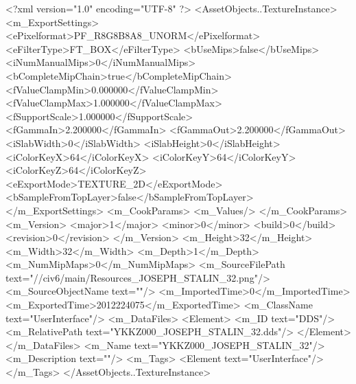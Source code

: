 <?xml version="1.0" encoding="UTF-8" ?>
<AssetObjects..TextureInstance>
	<m_ExportSettings>
		<ePixelformat>PF_R8G8B8A8_UNORM</ePixelformat>
		<eFilterType>FT_BOX</eFilterType>
		<bUseMips>false</bUseMips>
		<iNumManualMips>0</iNumManualMips>
		<bCompleteMipChain>true</bCompleteMipChain>
		<fValueClampMin>0.000000</fValueClampMin>
		<fValueClampMax>1.000000</fValueClampMax>
		<fSupportScale>1.000000</fSupportScale>
		<fGammaIn>2.200000</fGammaIn>
		<fGammaOut>2.200000</fGammaOut>
		<iSlabWidth>0</iSlabWidth>
		<iSlabHeight>0</iSlabHeight>
		<iColorKeyX>64</iColorKeyX>
		<iColorKeyY>64</iColorKeyY>
		<iColorKeyZ>64</iColorKeyZ>
		<eExportMode>TEXTURE_2D</eExportMode>
		<bSampleFromTopLayer>false</bSampleFromTopLayer>
	</m_ExportSettings>
	<m_CookParams>
		<m_Values/>
	</m_CookParams>
	<m_Version>
		<major>1</major>
		<minor>0</minor>
		<build>0</build>
		<revision>0</revision>
	</m_Version>
	<m_Height>32</m_Height>
	<m_Width>32</m_Width>
	<m_Depth>1</m_Depth>
	<m_NumMipMaps>0</m_NumMipMaps>
	<m_SourceFilePath text="//civ6/main/Resources_JOSEPH_STALIN_32.png"/>
	<m_SourceObjectName text=""/>
	<m_ImportedTime>0</m_ImportedTime>
	<m_ExportedTime>2012224075</m_ExportedTime>
	<m_ClassName text="UserInterface"/>
	<m_DataFiles>
		<Element>
			<m_ID text="DDS"/>
			<m_RelativePath text="YKKZ000_JOSEPH_STALIN_32.dds"/>
		</Element>
	</m_DataFiles>
	<m_Name text="YKKZ000_JOSEPH_STALIN_32"/>
	<m_Description text=""/>
	<m_Tags>
		<Element text="UserInterface"/>
	</m_Tags>
</AssetObjects..TextureInstance>

